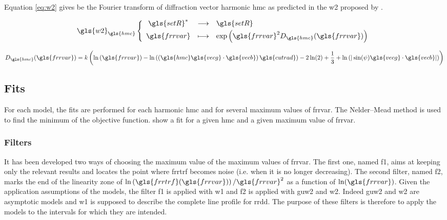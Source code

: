 \subsubsection{}

Equation \eqref{eq:w2} gives be the Fourier transform of diffraction vector harmonic \gls{hmc} as predicted in the \gls{w2} proposed by \textcite{KD2001}.

\begin{equation}
  \define{
    \gls{w2}_{\gls{hmc}}
  }{
    \gls{setR}^*
  }{
    \gls{setR}
  }{
    \gls{frrvar}
  }{
    \exp\left( \gls{frrvar}^2 D_{\gls{hmc}}(\gls{frrvar}) \right)
  }
  \label{eq:w2}
\end{equation}

\begin{equation}
  D_{\gls{hmc}}(\gls{frrvar}) =
    k \left( \ln \left( \gls{frrvar} \right) - \ln\left( \left( \gls{hmc} \gls{vecg} \cdot \gls{vecb} \right) \gls{cutrad} \right) - 2 \ln(2) +\frac{1}{3} + \ln\left(|\sin(\psi) \gls{vecg} \cdot \gls{vecb}| \right) \right)
\end{equation}

\subsection{Fits}

For each model, the fits are performed for each harmonic \gls{hmc} and for several maximum values of \gls{frrvar}.
The Nelder–Mead method is used to find the minimum of the objective function.
 show a fit for a given \gls{hmc} and a given maximum value of \gls{frrvar}.


\subsubsection{Filters}

It has been developed two ways of choosing the maximum value of the maximum values of \gls{frrvar}.
The first one, named \gls{f1}, aims at keeping only the relevant results and locates the point where \gls{frrtrf} becomes noise (i.e. when it is no longer decreasing).
The second filter, named \gls{f2}, marks the end of the linearity zone of \( \ln \left( \gls{frrtrf}(\gls{frrvar}) \right) / \gls{frrvar}^2 \) as a function of \( \ln(\gls{frrvar}) \).
Given the application assumptions of the models, the filter \gls{f1} is applied with \gls{w1} and \gls{f2} is applied with \gls{guw2} and \gls{w2}.
Indeed \gls{guw2} and \gls{w2} are asymptotic models and \gls{w1} is supposed to describe the complete line profile for \gls{rrdd}.
The purpose of these filters is therefore to apply the models to the intervals for which they are intended.

